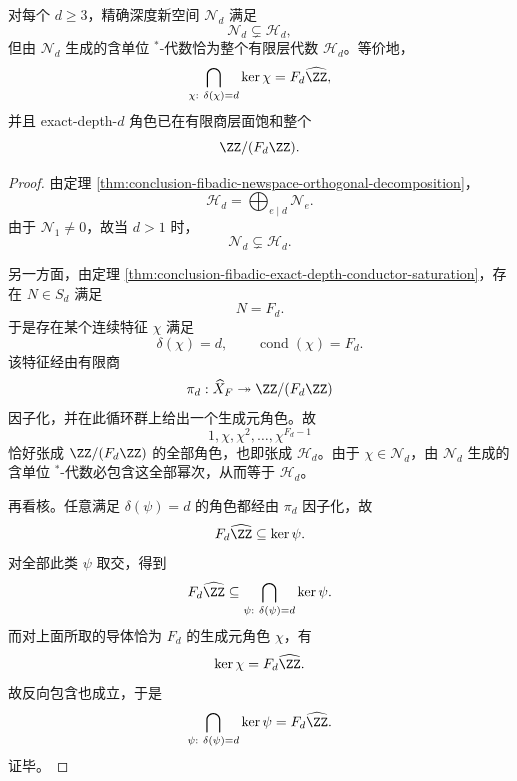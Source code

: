 \begin{theorem}[线性上真新生而代数上全穷尽]\label{thm:conclusion-fibadic-exact-depth-linear-thin-algebraic-saturation}
对每个 \(d\ge 3\)，精确深度新空间 \(\mathcal N_d\) 满足
\[
\mathcal N_d\subsetneq \mathcal H_d,
\]
但由 \(\mathcal N_d\) 生成的含单位 \(^*\)-代数恰为整个有限层代数 \(\mathcal H_d\)。等价地，
\[
\bigcap_{\chi:\ \delta(\chi)=d}\ker\chi
=
F_d\widehat{\ZZ},
\]
并且 exact-depth-\(d\) 角色已在有限商层面饱和整个
\[
\ZZ/(F_d\ZZ).
\]
\end{theorem}
\begin{proof}
由定理 \ref{thm:conclusion-fibadic-newspace-orthogonal-decomposition}，
\[
\mathcal H_d=\bigoplus_{e\mid d}\mathcal N_e.
\]
由于 \(\mathcal N_1\neq 0\)，故当 \(d>1\) 时，
\[
\mathcal N_d\subsetneq \mathcal H_d.
\]

另一方面，由定理 \ref{thm:conclusion-fibadic-exact-depth-conductor-saturation}，存在 \(N\in S_d\) 满足
\[
N=F_d.
\]
于是存在某个连续特征 \(\chi\) 满足
\[
\delta(\chi)=d,
\qquad
\operatorname{cond}(\chi)=F_d.
\]
该特征经由有限商
\[
\pi_d:\widehat X_F\twoheadrightarrow \ZZ/(F_d\ZZ)
\]
因子化，并在此循环群上给出一个生成元角色。故
\[
1,\chi,\chi^2,\dots,\chi^{F_d-1}
\]
恰好张成 \(\ZZ/(F_d\ZZ)\) 的全部角色，也即张成 \(\mathcal H_d\)。由于 \(\chi\in \mathcal N_d\)，由 \(\mathcal N_d\) 生成的含单位 \(^*\)-代数必包含这全部幂次，从而等于 \(\mathcal H_d\)。

再看核。任意满足 \(\delta(\psi)=d\) 的角色都经由 \(\pi_d\) 因子化，故
\[
F_d\widehat{\ZZ}\subseteq \ker\psi.
\]
对全部此类 \(\psi\) 取交，得到
\[
F_d\widehat{\ZZ}
\subseteq
\bigcap_{\psi:\ \delta(\psi)=d}\ker\psi.
\]
而对上面所取的导体恰为 \(F_d\) 的生成元角色 \(\chi\)，有
\[
\ker\chi=F_d\widehat{\ZZ}.
\]
故反向包含也成立，于是
\[
\bigcap_{\psi:\ \delta(\psi)=d}\ker\psi
=
F_d\widehat{\ZZ}.
\]
证毕。
\end{proof}

